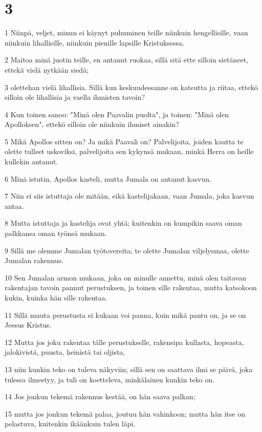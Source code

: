 \chapter{3}

\par 1 Niinpä, veljet, minun ei käynyt puhuminen teille niinkuin hengellisille, vaan niinkuin lihallisille, niinkuin pienille lapsille Kristuksessa.
\par 2 Maitoa minä juotin teille, en antanut ruokaa, sillä sitä ette silloin sietäneet, ettekä vielä nytkään siedä;
\par 3 olettehan vielä lihallisia. Sillä kun keskuudessanne on kateutta ja riitaa, ettekö silloin ole lihallisia ja vaella ihmisten tavoin?
\par 4 Kun toinen sanoo: "Minä olen Paavalin puolta", ja toinen: "Minä olen Apolloksen", ettekö silloin ole niinkuin ihmiset ainakin?
\par 5 Mikä Apollos sitten on? Ja mikä Paavali on? Palvelijoita, joiden kautta te olette tulleet uskoviksi, palvelijoita sen kykynsä mukaan, minkä Herra on heille kullekin antanut.
\par 6 Minä istutin, Apollos kasteli, mutta Jumala on antanut kasvun.
\par 7 Niin ei siis istuttaja ole mitään, eikä kastelijakaan, vaan Jumala, joka kasvun antaa.
\par 8 Mutta istuttaja ja kastelija ovat yhtä; kuitenkin on kumpikin saava oman palkkansa oman työnsä mukaan.
\par 9 Sillä me olemme Jumalan työtovereita; te olette Jumalan viljelysmaa, olette Jumalan rakennus.
\par 10 Sen Jumalan armon mukaan, joka on minulle annettu, minä olen taitavan rakentajan tavoin pannut perustuksen, ja toinen sille rakentaa, mutta katsokoon kukin, kuinka hän sille rakentaa.
\par 11 Sillä muuta perustusta ei kukaan voi panna, kuin mikä pantu on, ja se on Jeesus Kristus.
\par 12 Mutta jos joku rakentaa tälle perustukselle, rakensipa kullasta, hopeasta, jalokivistä, puusta, heinistä tai oljista,
\par 13 niin kunkin teko on tuleva näkyviin; sillä sen on saattava ilmi se päivä, joka tulessa ilmestyy, ja tuli on koetteleva, minkälainen kunkin teko on.
\par 14 Jos jonkun tekemä rakennus kestää, on hän saava palkan;
\par 15 mutta jos jonkun tekemä palaa, joutuu hän vahinkoon; mutta hän itse on pelastuva, kuitenkin ikäänkuin tulen läpi.
